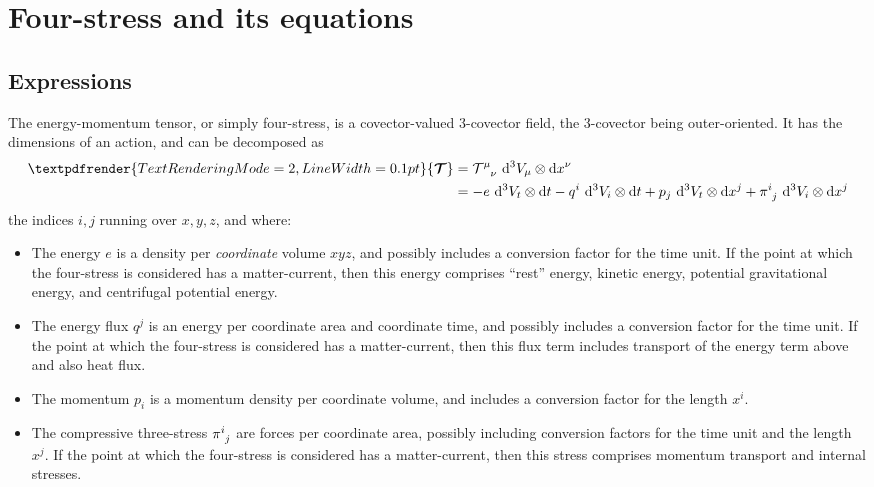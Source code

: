 \documentclass[a4paper,12pt,%
onecolumn,oneside,article,%
british%
]{memoir}
\theoremstyle{remark}
\theoremstyle{innote}
\newcommand*{\xbm}[1]{\textpdfrender{TextRenderingMode=2,LineWidth=0.1pt}{\boldsymbol{#1}}}
\newcommand*{\di}{\mathop{}\!\mathrm{d}}%
\renewcommand*{\|}[1][]{\nonscript\:#1\vert\nonscript\:\mathopen{}}
\renewcommand*{\i}{{}\indices}
\newcommand*{\si}[1]{\di{#1}}
\newcommand*{\ttti}[1]{\di^{3}V_{#1}}
\newcommand*{\yTT}{\xbm{\mathcal{T}}}
\newcommand*{\yT}{\mathcal{T}}
\newcommand*{\ye}{e}
\begin{document}
\section{Four-stress and its equations}
\label{sec:tensor_energy}

\subsection{Expressions}
\label{sec:expressions_4stress}


The energy-momentum tensor, or simply four-stress, is a covector-valued 3-covector field, the 3-covector being outer-oriented. It has the dimensions of an action, and can be decomposed as
\begin{equation}
  \label{eq:decomp_T}
  \begin{split}
    \yTT &= \yT\i{^{\mu}_{\nu}}\,\ttti{\mu}\otimes\si{x^{\nu}}
    \\&=
    -\ye\, \ttti{t}\otimes\si{t} 
    -q^{i}\, \ttti{i}\otimes\si{t} 
    +p_{j}\, \ttti{t}\otimes\si{x^{j}} 
    +\pi\i{^{i}_{j}}\, \ttti{i}\otimes\si{x^{j}}
  \end{split}
\end{equation}
the indices $i,j$ running over $x,y,z$, and where:
\begin{itemize}
\item The energy $\ye$ is a density per \emph{coordinate} volume $xyz$, and possibly includes a conversion factor for the time unit. If the point at which the four-stress is considered has a matter-current, then this energy comprises \enquote{rest} energy, kinetic energy, potential gravitational energy, and centrifugal potential energy.
\item The energy flux $q^{j}$ is an energy per coordinate area and coordinate time, and possibly includes a conversion factor for the time unit. If the point at which the four-stress is considered has a matter-current, then this flux term includes transport of the energy term above and also heat flux.
\item The momentum $p_{i}$ is a momentum density per coordinate volume, and includes a conversion factor for the length $x^{i}$.
\item The compressive three-stress $\pi\i{^{i}_{j}}$ are forces per coordinate area, possibly including conversion factors for the time unit and the length $x^{j}$.  If the point at which the four-stress is considered has a matter-current, then this stress comprises momentum transport and internal stresses.
\end{itemize}
\end{document}
